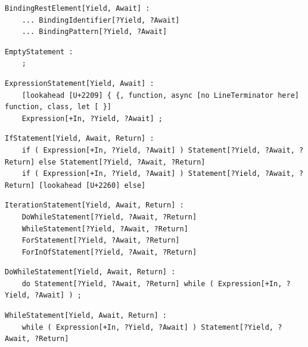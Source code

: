 \noindent\textbf{\texttt{}}\par
\begin{lstlisting}
BindingRestElement[Yield, Await] :
    ... BindingIdentifier[?Yield, ?Await]
    ... BindingPattern[?Yield, ?Await]
\end{lstlisting}

\noindent\textbf{\texttt{}}\par
\begin{lstlisting}
EmptyStatement :
    ;
\end{lstlisting}

\noindent\textbf{\texttt{}}\par
\begin{lstlisting}
ExpressionStatement[Yield, Await] :
    [lookahead [U+2209] { {, function, async [no LineTerminator here] function, class, let [ }]
    Expression[+In, ?Yield, ?Await] ;
\end{lstlisting}

\noindent\textbf{\texttt{}}\par
\begin{lstlisting}
IfStatement[Yield, Await, Return] :
    if ( Expression[+In, ?Yield, ?Await] ) Statement[?Yield, ?Await, ?Return] else Statement[?Yield, ?Await, ?Return]
    if ( Expression[+In, ?Yield, ?Await] ) Statement[?Yield, ?Await, ?Return] [lookahead [U+2260] else]
\end{lstlisting}

\noindent\textbf{\texttt{}}\par
\begin{lstlisting}
IterationStatement[Yield, Await, Return] :
    DoWhileStatement[?Yield, ?Await, ?Return]
    WhileStatement[?Yield, ?Await, ?Return]
    ForStatement[?Yield, ?Await, ?Return]
    ForInOfStatement[?Yield, ?Await, ?Return]
\end{lstlisting}

\noindent\textbf{\texttt{}}\par
\begin{lstlisting}
DoWhileStatement[Yield, Await, Return] :
    do Statement[?Yield, ?Await, ?Return] while ( Expression[+In, ?Yield, ?Await] ) ;
\end{lstlisting}

\noindent\textbf{\texttt{}}\par
\begin{lstlisting}
WhileStatement[Yield, Await, Return] :
    while ( Expression[+In, ?Yield, ?Await] ) Statement[?Yield, ?Await, ?Return]
\end{lstlisting}

